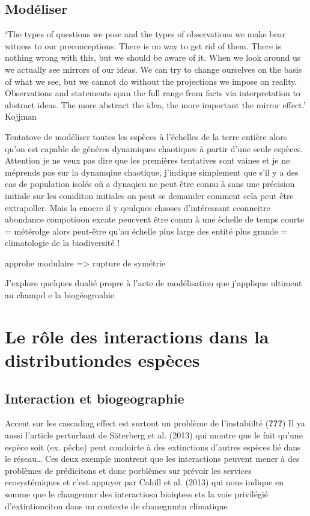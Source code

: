 \subsection{Modéliser}\label{moduxe9liser}

`The types of questions we pose and the types of observations we make
bear witness to our preconceptions. There is no way to get rid of them.
There is nothing wrong with this, but we should be aware of it. When we
look around us we actually see mirrors of our ideas. We can try to
change ourselves on the basis of what we see, but we cannot do without
the projections we impose on reality. Observations and statements span
the full range from facts via interpretation to abstract ideas. The more
abstract the idea, the more important the mirror effect.' Kojjman

Tentatove de modéliser toutes les espèces à l'échelles de la terre
entière alors qu'on est capable de généres dynamiques chaotiques à
partir d'une seule espèces. Attention je ne veux pas dire que les
premières tentatives sont vaines et je ne méprends pas sur la dynamqiue
chaotique, j'indique simplement que s'il y a des cas de population
isolés où a dynaqieu ne peut être connu à sans une précision initiale
sur les coniditon initiales on peut se demander comment cela peut être
extrapoller. Mais la enocre il y qeulques chsoses d'intéressant
cconneitre abondance compotioon excate peucvent être connu à une èchelle
de temps courte = métérolge alors peut-être qu'au échelle plus large des
entité plus grande = climatologie de la biodiversité !

approhe modulaire =\textgreater{} rupture de symétrie

J'explore quelques dualié propre à l'acte de modélisation que j'applique
ultiment au champd e la biogéogroahie

\section*{Le rôle des interactions dans la distributiondes
espèces}\label{le-ruxf4le-des-interactions-dans-la-distributiondes-espuxe8ces}

\subsection{Interaction et
biogeographie}\label{interaction-et-biogeographie}

Accent sur les cascading effect est surtout un problème de l'instabiilté
({\textbf{???}}) Il ya aussi l'article perturbant de Säterberg et al.
(2013) qui montre que le fait qu'une espèce soit (ex. pêche) peut
conduirte à des extinctions d'autres espèces lié dans le réseau\ldots{}
Ces deux exemple montrent que les interactions peuvent mener à des
problèmes de prédicitons et donc porblèmes sur prévoir les services
ecosystémiques et c'est appuyer par Cahill et al. (2013) qui nous
indique en somme que le changemnr des interactiosn bioiqtess ets la voie
privilégié d'extintionciton dans un contexte de chanegnmtn climatique

